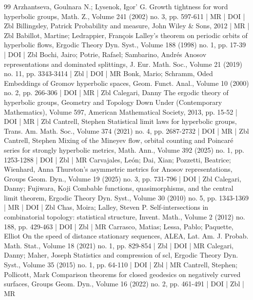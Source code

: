 \begin{thebibliography}{99}
 Arzhantseva, Goulnara N.; Lysenok, Igor’ G. Growth tightness for word hyperbolic groups, Math. Z., Volume 241 (2002) no. 3, pp. 597-611 | MR | DOI | Zbl
 Billingsley, Patrick Probability and measure, John Wiley \& Sons, 2012 | MR | Zbl
 Babillot, Martine; Ledrappier, François Lalley’s theorem on periodic orbits of hyperbolic flows, Ergodic Theory Dyn. Syst., Volume 188 (1998) no. 1, pp. 17-39 | DOI | Zbl
 Bochi, Jairo; Potrie, Rafael; Sambarino, Andrés Anosov representations and dominated splittings, J. Eur. Math. Soc., Volume 21 (2019) no. 11, pp. 3343-3414 | Zbl | DOI | MR
 Bonk, Mario; Schramm, Oded Embeddings of Gromov hyperbolic spaces, Geom. Funct. Anal., Volume 10 (2000) no. 2, pp. 266-306 | DOI | MR | Zbl
 Calegari, Danny The ergodic theory of hyperbolic groups, Geometry and Topology Down Under (Contemporary Mathematics), Volume 597, American Mathematical Society, 2013, pp. 15-52 | DOI | MR | Zbl
 Cantrell, Stephen Statistical limit laws for hyperbolic groups, Trans. Am. Math. Soc., Volume 374 (2021) no. 4, pp. 2687-2732 | DOI | MR | Zbl
 Cantrell, Stephen Mixing of the Mineyev flow, orbital counting and Poincaré series for strongly hyperbolic metrics, Math. Ann., Volume 392 (2025) no. 1, pp. 1253-1288 | DOI | Zbl | MR
 Carvajales, León; Dai, Xian; Pozzetti, Beatrice; Wienhard, Anna Thurston’s asymmetric metrics for Anosov representations, Groups Geom. Dyn., Volume 19 (2025) no. 3, pp. 731-796 | DOI | Zbl
 Calegari, Danny; Fujiwara, Koji Combable functions, quasimorphisms, and the central limit theorem, Ergodic Theory Dyn. Syst., Volume 30 (2010) no. 5, pp. 1343-1369 | MR | DOI | Zbl
 Chas, Moira; Lalley, Steven P. Self-intersections in combinatorial topology: statistical structure, Invent. Math., Volume 2 (2012) no. 188, pp. 429-463 | DOI | Zbl | MR
 Carrasco, Matias; Lessa, Pablo; Paquette, Elliot On the speed of distance stationary sequences, ALEA, Lat. Am. J. Probab. Math. Stat., Volume 18 (2021) no. 1, pp. 829-854 | Zbl | DOI | MR
 Calegari, Danny; Maher, Joseph Statistics and compression of scl, Ergodic Theory Dyn. Syst., Volume 35 (2015) no. 1, pp. 64-110 | DOI | Zbl | MR
 Cantrell, Stephen; Pollicott, Mark Comparison theorems for closed geodesics on negatively curved surfaces, Groups Geom. Dyn., Volume 16 (2022) no. 2, pp. 461-491 | DOI | Zbl | MR

\end{thebibliography}
